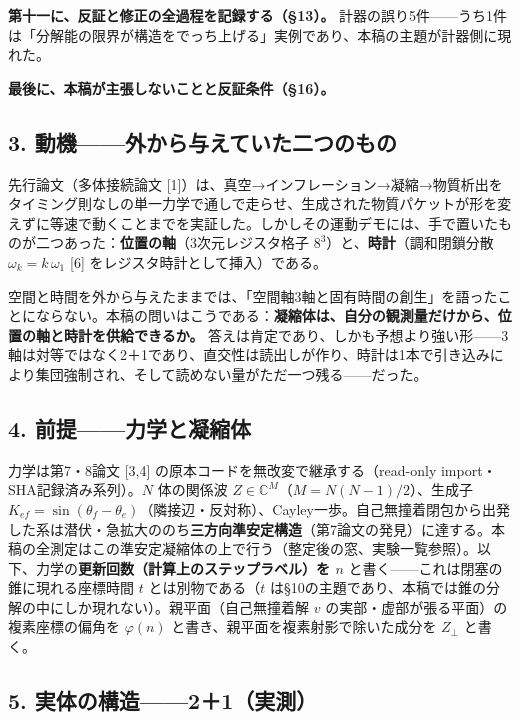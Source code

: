 \documentclass[
  a4paper,
]{ltjsarticle}
\begin{document}
\textbf{第十一に、反証と修正の全過程を記録する（§13）。}
計器の誤り5件------うち1件は「分解能の限界が構造をでっち上げる」実例であり、本稿の主題が計器側に現れた。

\textbf{最後に、本稿が主張しないことと反証条件（§16）。}

\subsection{3.
動機------外から与えていた二つのもの}\label{ux52d5ux6a5fux5916ux304bux3089ux4e0eux3048ux3066ux3044ux305fux4e8cux3064ux306eux3082ux306e}

先行論文（多体接続論文
{[}1{]}）は、真空→インフレーション→凝縮→物質析出をタイミング則なしの単一力学で通しで走らせ、生成された物質パケットが形を変えずに等速で動くことまでを実証した。しかしその運動デモには、手で置いたものが二つあった：\textbf{位置の軸}（3次元レジスタ格子
\(8^3\)）と、\textbf{時計}（調和閉鎖分散 \(\omega_k = k\,\omega_1\)
{[}6{]} をレジスタ時計として挿入）である。

空間と時間を外から与えたままでは、「空間軸3軸と固有時間の創生」を語ったことにならない。本稿の問いはこうである：\textbf{凝縮体は、自分の観測量だけから、位置の軸と時計を供給できるか。}
答えは肯定であり、しかも予想より強い形------3軸は対等ではなく2＋1であり、直交性は読出しが作り、時計は1本で引き込みにより集団強制され、そして読めない量がただ一つ残る------だった。

\subsection{4.
前提------力学と凝縮体}\label{ux524dux63d0ux529bux5b66ux3068ux51ddux7e2eux4f53}

力学は第7・8論文 {[}3,4{]} の原本コードを無改変で継承する（read-only
import・SHA記録済み系列）。\(N\) 体の関係波
\(Z \in \mathbb{C}^M\)（\(M=N(N-1)/2\)）、生成子
\(K_{ef}=\sin(\theta_f-\theta_e)\)（隣接辺・反対称）、Cayley一歩。自己無撞着閉包から出発した系は潜伏・急拡大ののち\textbf{三方向準安定構造}（第7論文の発見）に達する。本稿の全測定はこの準安定凝縮体の上で行う（整定後の窓、実験一覧参照）。以下、力学の\textbf{更新回数（計算上のステップラベル）を
\(n\)} と書く------これは閉塞の錐に現れる座標時間 \(t\)
とは別物である（\(t\)
は§10の主題であり、本稿では錐の分解の中にしか現れない）。親平面（自己無撞着解
\(v\) の実部・虚部が張る平面）の複素座標の偏角を \(\varphi(n)\)
と書き、親平面を複素射影で除いた成分を \(Z_\perp\) と書く。

\subsection{5.
実体の構造------2＋1（実測）}\label{ux5b9fux4f53ux306eux69cbux902021ux5b9fux6e2c}
\end{document}
